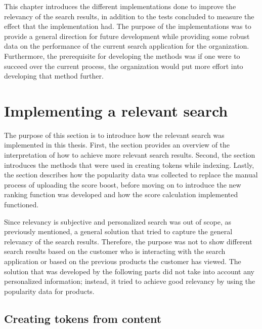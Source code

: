
This chapter introduces the different implementations done to improve the relevancy of the search results,
in addition to the tests concluded to measure the effect that the implementation had.
The purpose of the implementations was to provide a general direction for future development 
while providing some robust data on the performance of the current search application for the organization.
Furthermore, the prerequisite for developing the methods was if one were to succeed over the current
process, the organization would put more effort into developing that method further.



\section{Implementing a relevant search}


The purpose of this section is to introduce how the relevant search was implemented in this thesis.
First, the section provides an overview of the interpretation of how to achieve more relevant search 
results.
Second, the section introduces the methods that were used in creating tokens while indexing.
Lastly, the section describes how the popularity data was collected to replace
the manual process of uploading the score boost, before moving on to introduce
the new ranking function was developed and how the score calculation implemented functioned.


Since relevancy is subjective and personalized search was out of scope, as previously mentioned,
a general solution that tried to capture the general relevancy of the search results.
Therefore, the purpose was not to show different search results based on the customer who is interacting
with the search application or based on the previous products the customer has viewed.
The solution that was developed by the following parts did not take into account any personalized
information; instead, it tried to achieve good relevancy by using the popularity data for products.



\subsection{Creating tokens from content}
\label{ss:methodsTokens}


